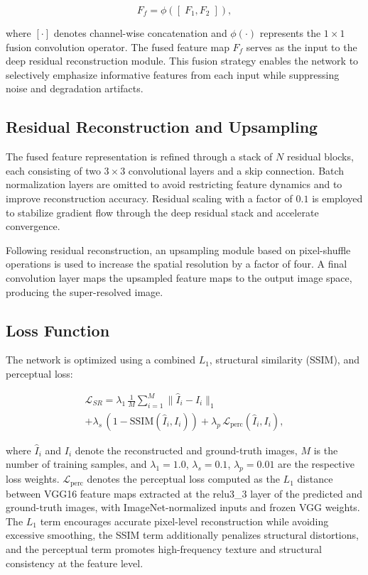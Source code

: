 \documentclass[conference]{IEEEtran}
\begin{document}
\begin{equation}
F_{f} = \phi([\;F_{1}, F_{2}\;]),
\end{equation}

where $[\cdot]$ denotes channel-wise concatenation and $\phi(\cdot)$ represents the $1 \times 1$ fusion convolution operator. The fused feature map $F_{f}$ serves as the input to the deep residual reconstruction module. This fusion strategy enables the network to selectively emphasize informative features from each input while suppressing noise and degradation artifacts.

\subsection{Residual Reconstruction and Upsampling}

The fused feature representation is refined through a stack of $N$ residual blocks, each consisting of two $3 \times 3$ convolutional layers and a skip connection. Batch normalization layers are omitted to avoid restricting feature dynamics and to improve reconstruction accuracy. Residual scaling with a factor of $0.1$ is employed to stabilize gradient flow through the deep residual stack and accelerate convergence.

Following residual reconstruction, an upsampling module based on pixel-shuffle operations is used to increase the spatial resolution by a factor of four. A final convolution layer maps the upsampled feature maps to the output image space, producing the super-resolved image.

\subsection{Loss Function}

The network is optimized using a combined $L_{1}$, structural similarity (SSIM), and perceptual loss:

\begin{multline}
\mathcal{L}_{SR} = \lambda_{1}\,\frac{1}{M}\sum_{i=1}^{M}\lVert\hat{I}_{i}-I_{i}\rVert_{1} \\
+ \lambda_{s}\,(1-\text{SSIM}(\hat{I}_{i},I_{i})) + \lambda_{p}\,\mathcal{L}_{\text{perc}}(\hat{I}_{i},I_{i}),
\end{multline}

where $\hat{I}_{i}$ and $I_{i}$ denote the reconstructed and ground-truth images, $M$ is the number of training samples, and $\lambda_{1}=1.0$, $\lambda_{s}=0.1$, $\lambda_{p}=0.01$ are the respective loss weights. $\mathcal{L}_{\text{perc}}$ denotes the perceptual loss computed as the $L_1$ distance between VGG16 feature maps extracted at the relu3\_3 layer of the predicted and ground-truth images, with ImageNet-normalized inputs and frozen VGG weights. The $L_{1}$ term encourages accurate pixel-level reconstruction while avoiding excessive smoothing, the SSIM term additionally penalizes structural distortions, and the perceptual term promotes high-frequency texture and structural consistency at the feature level.
\end{document}
